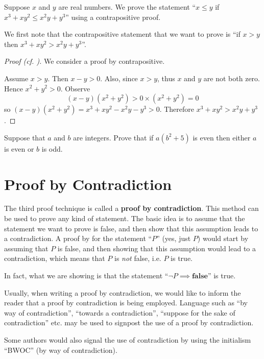 \begin{example}
    Suppose $x$ and $y$ are real numbers. We prove the statement ``$x \leq y$ if $x^3 + xy^2 \leq x^2y + y^3$'' using a contrapositive proof.

    We first note that the contrapositive statement that we want to prove is ``if $x > y$ then $x^3 + xy^2 > x^2y + y^3$''.

    \begin{proof}[Proof (cf. {\cite[p.~130]{hammack_2018}})]
        We consider a proof by contrapositive.

        Assume $x > y$. Then $x - y > 0$. Also, since $x > y$, thus $x$ and $y$ are not both zero. Hence $x^2 + y^2 > 0$.
        Observe
        \[
            (x-y)(x^2+y^2) > 0 \times (x^2+y^2) = 0
        \]
        so $(x-y)(x^2+y^2) = x^3 + xy^2 - x^2y - y^3 > 0$. Therefore $x^3 + xy^2 > x^2y + y^3$.
    \end{proof}
\end{example}

\begin{exercise}
    Suppose that $a$ and $b$ are integers. Prove that if $a(b^2 + 5)$ is even then either $a$ is even or $b$ is odd.
\end{exercise}

\section{Proof by Contradiction}
The third proof technique is called a \textbf{proof by contradiction}. This method can be used to prove any kind of statement. The basic idea is to assume that the statement we want to prove is false, and then show that this assumption leads to a contradiction. A proof by for the statement ``$P$'' (yes, just $P$) would start by assuming that $P$ is false, and then showing that this assumption would lead to a contradiction, which means that $P$ is \textit{not} false, i.e. $P$ is true.
\begin{remark}
    In fact, what we are showing is that the statement ``$\lnot P \implies \textbf{false}$'' is true.
\end{remark}

Usually, when writing a proof by contradiction, we would like to inform the reader that a proof by contradiction is being employed. Language such as ``by way of contradiction'', ``towards a contradiction'', ``suppose for the sake of contradiction'' etc. may be used to signpost the use of a proof by contradiction.
\begin{remark}
    Some authors would also signal the use of contradiction by using the initialism ``BWOC'' (by way of contradiction).
\end{remark}

